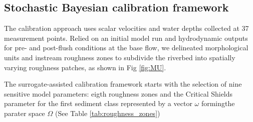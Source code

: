 \documentclass[draft,linenumbers,onecolumn]{agujournal2019} %
\begin{document}
%
%
%
%
%

\subsection{Stochastic Bayesian calibration framework}
{\label{sec:Sec2.7}} 

The calibration approach uses scalar velocities and water depths collected at 37 measurement points. Relied on an initial model run and hydrodynamic outputs for pre- and post-flush conditions at the base flow, we delineated morphological units and instream roughness zones to subdivide the riverbed into spatially varying roughness patches, as shown in Fig \ref{fig:MU}. 

The surrogate-assisted calibration framework starts with the selection of nine sensitive model parameters: eigth roughness zones and the Critical Shields parameter for the first sediment class represented by a vector \( \omega \) formingthe parater space \(\Omega\) (See Table \ref{tab:roughness_zones})
\end{document}
